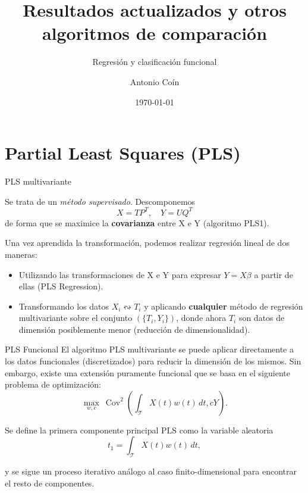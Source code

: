\documentclass[10pt, professionalfonts]{beamer}
\title{Resultados actualizados y otros algoritmos de comparación}
\subtitle{Regresión y clasificación funcional}
\date{\today \\}
\author{Antonio Coín}%
\institute{Universidad Autónoma de Madrid \\ \textit{Departamento de Matemáticas}}
\begin{document}
\maketitle

\section{Partial Least Squares (PLS)}

\begin{frame}{PLS multivariante}

Se trata de un \textit{método supervisado}. Descomponemos
\[
X = TP^T, \quad Y = UQ^T
\]
de forma que se maximice la \textbf{covarianza} entre X e Y (algoritmo PLS1).

Una vez aprendida la transformación, podemos realizar regresión lineal de dos maneras:

\begin{itemize}
  \item Utilizando las transformaciones de X e Y para expresar $Y=X\beta$ a partir de ellas (PLS Regression).
  \item Transformando los datos $X_i\leftrightsquigarrow T_i$ y aplicando \textbf{cualquier} método de regresión multivariante sobre el conjunto $(\{T_i, Y_i\})$, donde ahora $T_i$ son datos de dimensión posiblemente menor (reducción de dimensionalidad).
\end{itemize}
\end{frame}

\begin{frame}{PLS Funcional}
  El algoritmo PLS multivariante se puede aplicar directamente a los datos funcionales (discretizados) para reducir la dimensión de los mismos. Sin embargo, existe una extensión puramente funcional \parencite{preda2002pls} que se basa en el siguiente problema de optimización:
  \[
  \max_{w, c} \ \operatorname{Cov}^2\left( \int_{\mathcal T} X(t)w(t)\, dt, cY\right).
  \]

Se define la primera componente principal PLS como la variable aleatoria
\[
t_1 = \int_{\mathcal T} X(t)w(t)\, dt,
\]

y se sigue un proceso iterativo análogo al caso finito-dimensional para encontrar el resto de componentes.

\end{frame}
\end{document}
